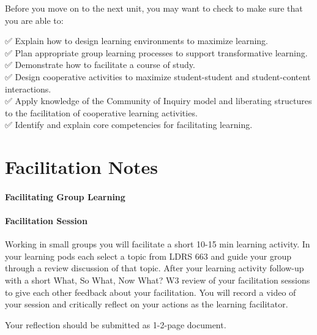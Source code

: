 \documentclass[
]{book}
\begin{document}
Before you move on to the next unit, you may want to check to make sure that you are able to:

✅ Explain how to design learning environments to maximize learning.\\
✅ Plan appropriate group learning processes to support transformative learning.\\
✅ Demonstrate how to facilitate a course of study.\\
✅ Design cooperative activities to maximize student-student and student-content interactions.\\
✅ Apply knowledge of the Community of Inquiry model and liberating structures to the facilitation of cooperative learning activities.\\
✅ Identify and explain core competencies for facilitating learning.

\hypertarget{facilitation-notes}{%
\chapter*{Facilitation Notes}\label{facilitation-notes}}

\hypertarget{facilitating-group-learning}{%
\subsubsection*{Facilitating Group Learning}\label{facilitating-group-learning}}

\hypertarget{facilitation-session}{%
\subsubsection*{Facilitation Session}\label{facilitation-session}}

Working in small groups you will facilitate a short 10-15 min learning activity. In your learning pods each select a topic from LDRS 663 and guide your group through a review discussion of that topic. After your learning activity follow-up with a short What, So What, Now What? W3 review of your facilitation sessions to give each other feedback about your facilitation. You will record a video of your session and critically reflect on your actions as the learning facilitator.

Your reflection should be submitted as 1-2-page document.
\end{document}

